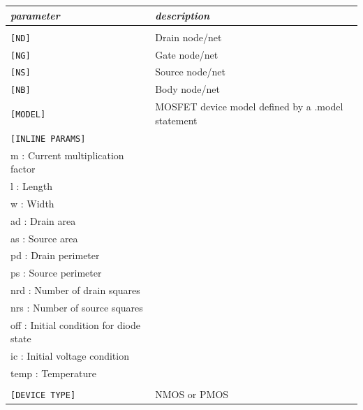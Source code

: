 \begin{longtable}{l l}
\textit{parameter} & \textit{description} \\ \hline \\ \vspace{-0.8\parskip}
\texttt{[ND]} & Drain node/net \\
\texttt{[NG]} & Gate node/net \\
\texttt{[NS]} & Source node/net \\
\texttt{[NB]} & Body node/net \\
\texttt{[MODEL]} & MOSFET device model defined by a .model statement \\
\texttt{[INLINE PARAMS]} & \begin{tabular}{lp{5.5cm}p{5cm}}\textit{Inline parameters :} \\ 
																					{\small m : Current multiplication factor} \\ 
																					{\small l : Length}\\
																					{\small w : Width} \\
																					{\small ad : Drain area} \\
																					{\small as : Source area} \\
																					{\small pd : Drain perimeter} \\
																					{\small ps : Source perimeter} \\
																					{\small nrd : Number of drain squares} \\
																					{\small nrs : Number of source squares} \\																					{\small off : Initial condition for diode state} \\
																					{\small ic :  Initial voltage condition} \\
																					{\small temp : Temperature} \\
																					\end{tabular} \\
\texttt{[DEVICE TYPE]} & NMOS or PMOS \\																					
\end{longtable}

